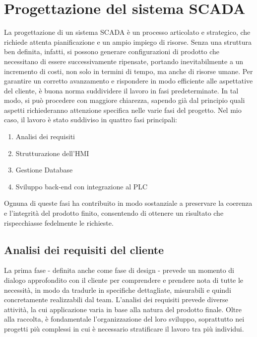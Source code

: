 \chapter{Progettazione del sistema SCADA}

La progettazione di un sistema SCADA è un processo articolato e strategico, che richiede attenta pianificazione e un ampio impiego di risorse. Senza una struttura ben definita, infatti, si possono generare configurazioni di prodotto che necessitano di essere successivamente ripensate, portando inevitabilmente a un incremento di costi, non solo in termini di tempo, ma anche di risorse umane.
Per garantire un corretto avanzamento e rispondere in modo efficiente alle aspettative del cliente, è buona norma suddividere il lavoro in fasi predeterminate. In tal modo, si può procedere con maggiore chiarezza, sapendo già dal principio quali aspetti richiederanno attenzione specifica nelle varie fasi del progetto. Nel mio caso, il lavoro è stato suddiviso in quattro fasi principali:
\begin{enumerate}
    \item Analisi dei requisiti
    \item Strutturazione dell'HMI
    \item Gestione Database
    \item Sviluppo back-end con integrazione al PLC
\end{enumerate}
Ognuna di queste fasi ha contribuito in modo sostanziale a preservare la coerenza e l'integrità del prodotto finito, consentendo di ottenere un risultato che rispecchiasse fedelmente le richieste.

\section{Analisi dei requisiti del cliente}

La prima fase - definita anche come fase di design - prevede un momento di dialogo approfondito con il cliente per comprendere e prendere nota di tutte le necessità, in modo da tradurle in specifiche dettagliate, misurabili e quindi concretamente realizzabili dal team. L'analisi dei requisiti prevede diverse attività, la cui applicazione varia in base alla natura del prodotto finale. Oltre alla raccolta, è fondamentale l'organizzazione del loro sviluppo, soprattutto nei progetti più complessi in cui è necessario stratificare il lavoro tra più individui. 

